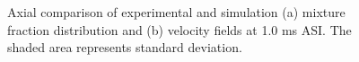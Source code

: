 \documentclass[letterpaper, 10pt, oneside, twocolumn, final]{article}
\newcommand{\2}{\ensuremath $_2$}
\begin{document}
%                                                                                                 
	


\begin{figure}[htb]
	\begin{center}
		\caption{ Axial comparison of experimental and simulation  (a) mixture fraction distribution and (b) velocity fields at 1.0 ms ASI.  The shaded area represents standard deviation.}
		\label{fig:axial}
	\end{center}
\end{figure}

\end{document}
